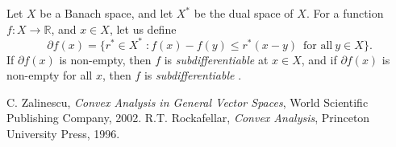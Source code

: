 \documentclass[12pt]{article}
\begin{document}
Let $X$ be a Banach space, and let $X^*$ be the dual space of $X$.
For a function $f \colon X \rightarrow \mathbb{R}$, and $x\in X$, let
us define 
$$
\partial f(x) = \{r^* \in X^* \; : f(x) - f(y) \leq  r^\ast(x - y) \; \ \mbox{for all} \  y \in X\}.
$$
If $\partial f(x)$ is non-empty, then $f$ is \emph{subdifferentiable} 
   at $x \in X$, and if $\partial f(x)$ is non-empty for all $x$, then 
$f$ is \emph{subdifferentiable} \cite{Zalinescu, Rockafellar}.

\begin{thebibliography}{9}
     C. Zalinescu, \emph{Convex Analysis in General Vector Spaces},
     World Scientific Publishing Company, 2002.
 R.T. Rockafellar,
\emph{Convex Analysis},
Princeton University Press, 1996.
\end{thebibliography}
\end{document}
